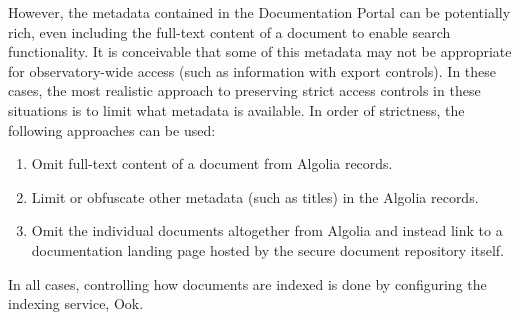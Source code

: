 However, the metadata contained in the Documentation Portal can be potentially rich, even including the full-text content of a document to enable search functionality.
It is conceivable that some of this metadata may not be appropriate for observatory-wide access (such as information with export controls).
In these cases, the most realistic approach to preserving strict access controls in these situations is to limit what metadata is available.
In order of strictness, the following approaches can be used:

\begin{enumerate}
  \item Omit full-text content of a document from Algolia records.
  \item Limit or obfuscate other metadata (such as titles) in the Algolia records.
  \item Omit the individual documents altogether from Algolia and instead link to a documentation landing page hosted by the secure document repository itself.
\end{enumerate}

In all cases, controlling how documents are indexed is done by configuring the indexing service, Ook.
